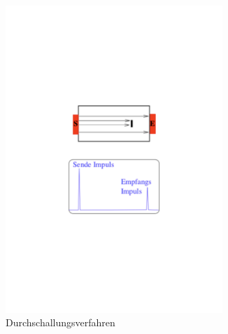 \begin{figure}[h!]
 \centering
 \begin{subfigure}{0.49\textwidth}
  \centering
  \includegraphics[width=0.9\textwidth]{durchschall.pdf}
  \caption{Durchschallungsverfahren \cite{1}}
  \label{fig:durchschall}
 \end{subfigure}
 \begin{subfigure}{0.49\textwidth}
  \centering

\end{subfigure}
\end{figure}
